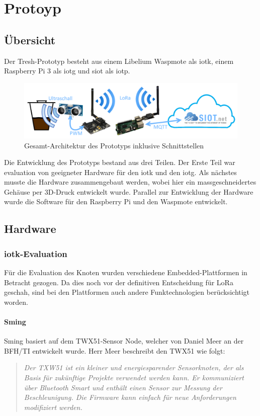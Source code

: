 \chapter{Protoyp}
\section{Übersicht}
Der Tresh-Prototyp besteht aus einem Libelium Waspmote als \gls{iotk}, einem Raspberry Pi 3 als \gls{iotg} und \gls{siot} als \gls{iotp}.
\begin{figure}[H]
     \centering
        \includegraphics[width=1.0\textwidth]{pictures/PrototypeConcept.png}
    \caption{Gesamt-Architektur des Prototyps inklusive Schnittstellen}
    \label{fig:PrototypeConcept}
\end{figure}
Die Entwicklung des Prototyps bestand aus drei Teilen. Der Erste Teil war evaluation von geeigneter Hardware für den \gls{iotk} und den \gls{iotg}. Als nächstes musste die Hardware zusammengebaut werden, wobei hier ein massgeschneidertes Gehäuse per 3D-Druck entwickelt wurde. Parallel zur Entwicklung der Hardware wurde die Software für den Raspberry Pi und den Waspmote entwickelt. 

\section{Hardware}

\subsection*{\gls{iotk}-Evaluation}
Für die Evaluation des Knoten wurden verschiedene Embedded-Plattformen in Betracht gezogen. Da dies noch vor der definitiven Entscheidung für LoRa geschah, sind bei den Plattformen auch andere Funktechnologien berücksichtigt worden.

\subsubsection*{Sming}
Sming basiert auf dem TWX51-Sensor Node, welcher von Daniel Meer an der BFH/TI  entwickelt wurde. Herr Meer beschreibt den TWX51 wie folgt: 
\begin{quote}
\textit{Der TXW51 ist ein kleiner und energiesparender Sensorknoten, der als Basis für zukünftige Projekte verwendet werden
kann. Er kommuniziert über Bluetooth Smart und enthält einen Sensor zur Messung der Beschleunigung. Die Firmware kann einfach für neue Anforderungen modifiziert werden.}\autocite{bfh:TXW51}
\end{quote}

